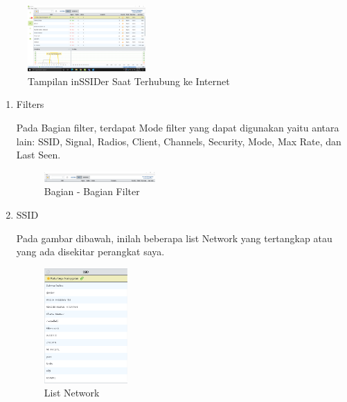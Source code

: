 \documentclass[conference]{IEEEtran}
\begin{document}
\begin{figure}[h]
	\centering
	\includegraphics[width=0.4\textwidth]{2.png}
	\caption{Tampilan inSSIDer Saat Terhubung ke Internet}
\end{figure}

\begin{enumerate}
    \item Filters
    \vspace{0.2cm}
    
    Pada Bagian filter, terdapat Mode filter yang dapat
    digunakan yaitu antara lain: SSID, Signal, Radios, Client, Channels, Security, Mode, Max Rate, dan Last Seen.
    
    \begin{figure}[h]
        \centering
        \includegraphics[width=0.4\textwidth]{3.png}
        \caption{Bagian - Bagian Filter}
    \end{figure}
    
    \vspace{0.2cm}
    
    \item SSID
    \vspace{0.2cm}
    
    Pada gambar dibawah, inilah beberapa list Network yang tertangkap atau yang ada disekitar perangkat saya.
    
    \begin{figure}[h]
        \centering
        \includegraphics[width=0.3\textwidth]{4.png}
        \caption{List Network}
    \end{figure}
    \vspace{0.2cm}
    

\end{enumerate}
\end{document}
